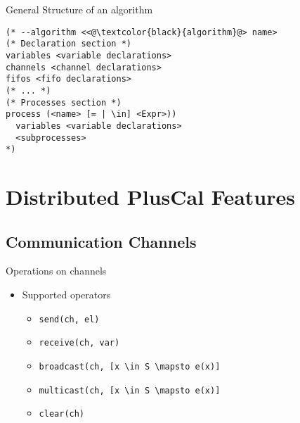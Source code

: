 \documentclass{beamer}
\begin{document}
\begin{frame}[fragile]{General Structure of an algorithm}
\begin{lstlisting}[language=pluscal, frame = tlrb, numbers = none]
(* --algorithm <<@\textcolor{black}{algorithm}@> name>
(* Declaration section *)
variables <variable declarations>
channels <channel declarations>
fifos <fifo declarations>
(* ... *)
(* Processes section *)
process (<name> [= | \in] <Expr>))
  variables <variable declarations>
  <subprocesses>
*)
\end{lstlisting}
\end{frame}

\section{Distributed PlusCal Features}

\subsection{Communication Channels}

\begin{frame}[fragile]{Operations on channels}
    \begin{itemize}
     \item Supported operators 
            \begin{itemize}
                \item \verb|send(ch, el)|
                \item \verb|receive(ch, var)|
                \item \verb|broadcast(ch, [x \in S \mapsto e(x)]| 
                \item \verb|multicast(ch, [x \in S \mapsto e(x)]|
                \item \verb|clear(ch)|
            \end{itemize}
    \end{itemize}
\end{frame}
\end{document}
